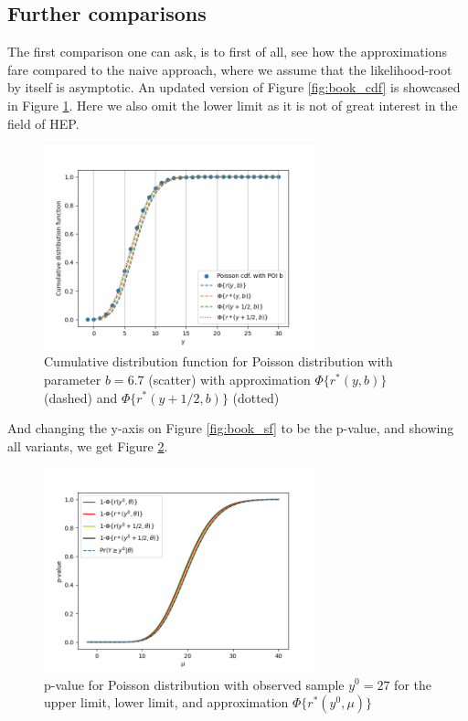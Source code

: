 \documentclass[14pt, a4paper]{article}  %
\begin{document}
\subsection{Further comparisons}
The first comparison one can ask, is to first of all, see how the approximations fare compared to the naive approach, where we assume that the likelihood-root by itself is asymptotic. An updated version of Figure \ref{fig:book_cdf} is showcased in Figure \ref{fig:book_cdf_fr}. Here we also omit the lower limit as it is not of great interest in the field of HEP.
\begin{figure}[!ht]
	\centering
        \includegraphics[width=0.7\textwidth]{book_example/book_cdf.png}
	\caption{Cumulative distribution function for Poisson distribution with parameter $b=6.7$ (scatter) with approximation $\Phi\{r^*(y,b)\}$ (dashed) and $\Phi\{r^*(y+1/2,b)\}$ (dotted)}\label{fig:book_cdf_fr}
\end{figure} 
And changing the y-axis on Figure \ref{fig:book_sf} to be the p-value, and showing all variants, we get Figure \ref{fig:book_sf_fr}.
\begin{figure}[!ht]
	\centering
        \includegraphics[width=0.7\textwidth]{book_example/book_sig.png}
	\caption{p-value for Poisson distribution with observed sample $y^0=27$ for the upper limit, lower limit, and approximation $\Phi\{r^*(y^0,\mu)\}$}\label{fig:book_sf_fr}
\end{figure} 
\end{document}
